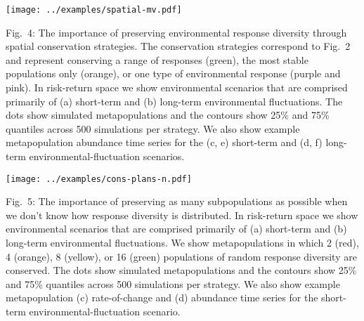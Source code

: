 \texttt{[image: ../examples/spatial-mv.pdf]}

Fig.~4: The importance of preserving environmental response diversity through spatial conservation strategies. The conservation strategies correspond to Fig.~2 and represent conserving a range of responses (green), the most stable populations only (orange), or one type of environmental response (purple and pink). In risk-return space we show environmental scenarios that are comprised primarily of (a) short-term and (b) long-term environmental fluctuations. The dots show simulated metapopulations and the contours show 25\% and 75\% quantiles across 500 simulations per strategy. We also show example metapopulation abundance time series for the (c, e) short-term and (d, f) long-term environmental-fluctuation scenarios.

\clearpage

\texttt{[image: ../examples/cons-plans-n.pdf]}

Fig.~5: The importance of preserving as many subpopulations as possible when we don't know how response diversity is distributed. In risk-return space we show environmental scenarios that are comprised primarily of (a) short-term and (b) long-term environmental fluctuations. We show metapopulations in which 2 (red), 4 (orange), 8 (yellow), or 16 (green) populations of random response diversity are conserved. The dots show simulated metapopulations and the contours show 25\% and 75\% quantiles across 500 simulations per strategy. We also show example metapopulation (c) rate-of-change and (d) abundance time series for the short-term environmental-fluctuation scenario.

